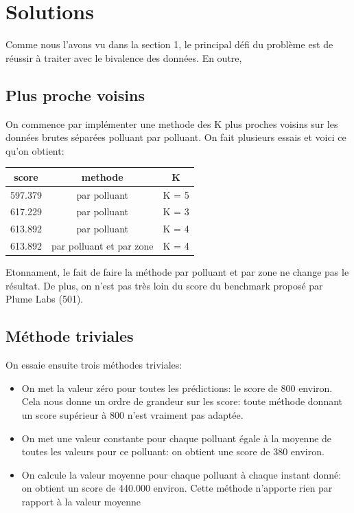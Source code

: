 \section{Solutions}

Comme nous l'avons vu dans la section 1, le principal défi du problème est de réussir à traiter avec le bivalence des données. En outre, 

\subsection{Plus proche voisins}

On commence par implémenter une methode des K plus proches voisins sur les données brutes séparées polluant par polluant.
On fait plusieurs essais et voici ce qu'on obtient:

\begin{tabular}{|c|c|c|}
  \hline
  score & methode & K \\
  \hline
  597.379 &  par polluant & K = 5\\
  \hline
  617.229 & par polluant & K = 3\\
  \hline
  613.892 & par polluant  & K = 4\\
  \hline
  613.892 & par polluant et par zone & K = 4\\
  \hline
\end{tabular}

Etonnament, le fait de faire la méthode par polluant et par zone ne change pas le résultat.
De plus, on n'est pas très loin du score du benchmark proposé par Plume Labs (501).

\subsection{Méthode triviales}

On essaie ensuite trois méthodes triviales:
\begin{itemize}
  \item
    On met la valeur zéro pour toutes les prédictions: le score de 800 environ.
    Cela nous donne un ordre de grandeur sur les score: toute méthode donnant un score supérieur à 800 n'est vraiment pas adaptée.
  \item
    On met une valeur constante pour chaque polluant égale à la moyenne de toutes les valeurs pour ce polluant: on obtient une score de 380 environ.
  \item
    On calcule la valeur moyenne pour chaque polluant à chaque instant donné: on obtient un score de 440.000 environ.
    Cette méthode n'apporte rien par rapport à la valeur moyenne %
\end{itemize}

